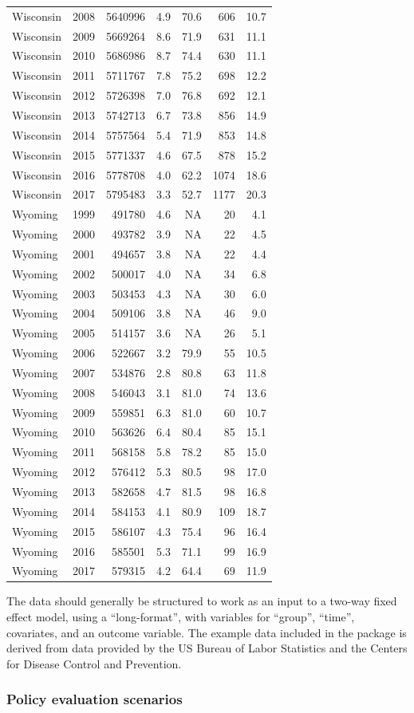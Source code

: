 \documentclass[
]{article}
\begin{document}
\begin{longtable}[]{@{}lrrrrrr@{}}
Wisconsin & 2008 & 5640996 & 4.9 & 70.6 & 606 & 10.7\tabularnewline
Wisconsin & 2009 & 5669264 & 8.6 & 71.9 & 631 & 11.1\tabularnewline
Wisconsin & 2010 & 5686986 & 8.7 & 74.4 & 630 & 11.1\tabularnewline
Wisconsin & 2011 & 5711767 & 7.8 & 75.2 & 698 & 12.2\tabularnewline
Wisconsin & 2012 & 5726398 & 7.0 & 76.8 & 692 & 12.1\tabularnewline
Wisconsin & 2013 & 5742713 & 6.7 & 73.8 & 856 & 14.9\tabularnewline
Wisconsin & 2014 & 5757564 & 5.4 & 71.9 & 853 & 14.8\tabularnewline
Wisconsin & 2015 & 5771337 & 4.6 & 67.5 & 878 & 15.2\tabularnewline
Wisconsin & 2016 & 5778708 & 4.0 & 62.2 & 1074 & 18.6\tabularnewline
Wisconsin & 2017 & 5795483 & 3.3 & 52.7 & 1177 & 20.3\tabularnewline
Wyoming & 1999 & 491780 & 4.6 & NA & 20 & 4.1\tabularnewline
Wyoming & 2000 & 493782 & 3.9 & NA & 22 & 4.5\tabularnewline
Wyoming & 2001 & 494657 & 3.8 & NA & 22 & 4.4\tabularnewline
Wyoming & 2002 & 500017 & 4.0 & NA & 34 & 6.8\tabularnewline
Wyoming & 2003 & 503453 & 4.3 & NA & 30 & 6.0\tabularnewline
Wyoming & 2004 & 509106 & 3.8 & NA & 46 & 9.0\tabularnewline
Wyoming & 2005 & 514157 & 3.6 & NA & 26 & 5.1\tabularnewline
Wyoming & 2006 & 522667 & 3.2 & 79.9 & 55 & 10.5\tabularnewline
Wyoming & 2007 & 534876 & 2.8 & 80.8 & 63 & 11.8\tabularnewline
Wyoming & 2008 & 546043 & 3.1 & 81.0 & 74 & 13.6\tabularnewline
Wyoming & 2009 & 559851 & 6.3 & 81.0 & 60 & 10.7\tabularnewline
Wyoming & 2010 & 563626 & 6.4 & 80.4 & 85 & 15.1\tabularnewline
Wyoming & 2011 & 568158 & 5.8 & 78.2 & 85 & 15.0\tabularnewline
Wyoming & 2012 & 576412 & 5.3 & 80.5 & 98 & 17.0\tabularnewline
Wyoming & 2013 & 582658 & 4.7 & 81.5 & 98 & 16.8\tabularnewline
Wyoming & 2014 & 584153 & 4.1 & 80.9 & 109 & 18.7\tabularnewline
Wyoming & 2015 & 586107 & 4.3 & 75.4 & 96 & 16.4\tabularnewline
Wyoming & 2016 & 585501 & 5.3 & 71.1 & 99 & 16.9\tabularnewline
Wyoming & 2017 & 579315 & 4.2 & 64.4 & 69 & 11.9\tabularnewline
\bottomrule
\end{longtable}

The data should generally be structured to work as an input to a two-way
fixed effect model, using a ``long-format'', with variables for
``group'', ``time'', covariates, and an outcome variable. The example
data included in the package is derived from data provided by the US
Bureau of Labor Statistics and the Centers for Disease Control and
Prevention.

\hypertarget{policy-evaluation-scenarios}{%
\subsubsection{Policy evaluation
scenarios}\label{policy-evaluation-scenarios}}
\end{document}
